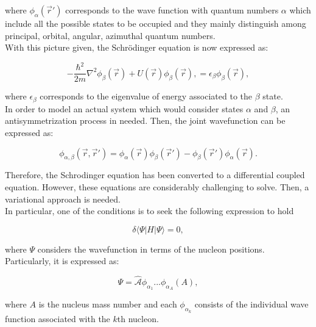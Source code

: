 \documentclass[openany]{book}
\begin{document}
where $ \phi_\alpha(\vec r') $ corresponds to the wave function with quantum numbers $\alpha$ which include all the possible states to be occupied and they mainly distinguish among principal, orbital, angular, azimuthal quantum numbers. \\

With this picture given, the Schrödinger equation is now expressed as: 

\begin{equation}\label{eq:micro_hartreeFock_schrodinger}
	-\frac{\hbar^2}{2m} \nabla^2 \phi_\beta(\vec r) + U(\vec r)  \phi_\beta(\vec r), = \epsilon_\beta  \phi_\beta(\vec r), 
\end{equation}

where $\epsilon_\beta$ corresponds to the eigenvalue of energy associated to the $\beta$ state. \\

In order to model an actual system which would consider states $\alpha$ and $\beta$, an antisymmetrization process in needed. Then, the joint wavefunction can be expressed as: 

\begin{equation}\label{eq:micro_hartreeFock_antisymmetrization}
	\phi_{\alpha, \beta}(\vec r, \vec r') = \phi_\alpha (\vec r) \phi_\beta  (\vec r' ) - \phi_\beta (\vec r') \phi_\alpha  (\vec r ). 
\end{equation}

Therefore, the Schrodinger equation has been converted to a differential coupled equation. However, these equations are considerably challenging to solve. Then, a variational approach is needed. \\

In particular, one of the conditions is to seek the following expression to hold

\begin{equation} \label{eq:micro_hartreeFock_optimal}
	\delta \langle \Psi | H | \Psi \rangle = 0,
\end{equation}

where $\Psi$ considers the wavefunction in terms of the nucleon positions. Particularly, it is expressed as: 

\begin{equation} \label{eq:micro_hartreeFock_Psi}
	\Psi = \hat{\mathcal{A}}  \phi_{\alpha_1} ...  \phi_{\alpha_A} (A),
\end{equation}

where $A$ is the nucleus mass number and each $\phi_{\alpha_k}$ consists of the individual wave function associated with the $k$th nucleon. \\
\end{document}
